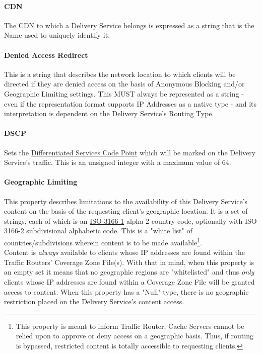 \paragraph{CDN}
The CDN to which a Delivery Service belongs is expressed as a string that is the
Name used to uniquely identify it.


\paragraph{Denied Access Redirect}
This is a string that describes the network location to which clients will be
directed if they are denied access on the basis of Anonymous Blocking and/or
Geographic Limiting settings. This MUST always be represented as a string - even
if the representation format supports IP Addresses as a native type - and its
interpretation is dependent on the Delivery Service's Routing Type.

\paragraph{DSCP}
Sets the
\href{https://tools.ietf.org/html/rfc2474}{Differentiated Services Code Point}
which will be marked on the Delivery Service's traffic. This is an unsigned
integer with a maximum value of 64.


\paragraph{Geographic Limiting}
This property describes limitations to the availability of this Delivery
Service's content on the basis of the requesting client's geographic location.
It is a set of strings, each of which is an
\href{https://www.iso.org/obp/ui/#search/code/}{ISO 3166-1} alpha-2 country
code, optionally with ISO 3166-2 subdivisional alphabetic code. This is a "white
list" of countries/subdivisions wherein content is to be made
available\footnote{This property is meant to inform Traffic Router; Cache
Servers cannot be relied upon to approve or deny access on a geographic basis.
Thus, if routing is bypassed, restricted content is totally accessible to
requesting clients.}.\\
Content is \emph{always} available to clients whose IP addresses are found
within the Traffic Routers' Coverage Zone File(s). With that in mind, when this
property is an empty set it means that no geographic regions are "whitelisted"
and thus \emph{only} clients whose IP addresses are found within a Coverage Zone
File will be granted access to content. When this property has a "Null" type,
there is no geographic restriction placed on the Delivery Service's content
access.


